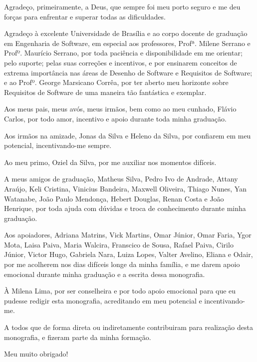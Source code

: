 \begin{agradecimentos}

	Agradeço, primeiramente, a Deus, que sempre foi meu porto seguro e me deu forças para enfrentar e superar todas as dificuldades.
	 
	Agradeço à excelente Universidade de Brasília e ao corpo docente de graduação em Engenharia de Software, em especial aos professores, Profª. Milene Serrano e Profº. Maurício Serrano, por toda paciência e disponibilidade em me orientar; pelo suporte; pelas suas correções e incentivos, e por ensinarem conceitos de extrema importância nas áreas de Desenho de Software e Requisitos de Software; e ao Profº. George Marsicano Corrêa, por ter aberto meu horizonte sobre Requisitos de Software de uma maneira tão fantástica e exemplar.
	
	Aos meus pais, meus avós, meus irmãos, bem como ao meu cunhado, Flávio Carlos, por todo amor, incentivo e apoio durante toda minha graduação. 
	
	Aos irmãos na amizade, Jonas da Silva e Heleno da Silva, por confiarem em meu potencial, incentivando-me sempre. 
	
	Ao meu primo, Oziel da Silva, por me auxiliar nos momentos difíceis. 
	
	A meus amigos de graduação, Matheus Silva, Pedro Ivo de Andrade, Attany Araújo, Keli Cristina, Vinicius Bandeira, Maxwell Oliveira, Thiago Nunes, Yan Watanabe, João Paulo Mendonça, Hebert Douglas, Renan Costa e João Henrique, por toda ajuda com dúvidas e troca de conhecimento durante minha graduação. 
	
	Aos apoiadores, Adriana Matrins, Vick Martins, Omar Júnior, Omar Faria, Ygor Mota, Laisa Paiva, Maria Walcira, Franscico de Sousa, Rafael Paiva, Cirilo Júnior, Victor Hugo, Gabriela Nara, Luiza Lopes, Valter Avelino, Eliana e Odair,  por me acolherem nos dias difíceis longe da minha família,  e me darem apoio emocional durante minha graduação e a escrita dessa monografia. 
	
	À Milena Lima, por ser conselheira e por todo apoio emocional para que eu pudesse redigir esta monografia, acreditando em meu potencial e incentivando-me.
	
	A todos que de forma direta ou indiretamente contribuiram para realização desta monografia, e fizeram parte da minha formação. 
	
	Meu muito obrigado!  
	
\end{agradecimentos}
